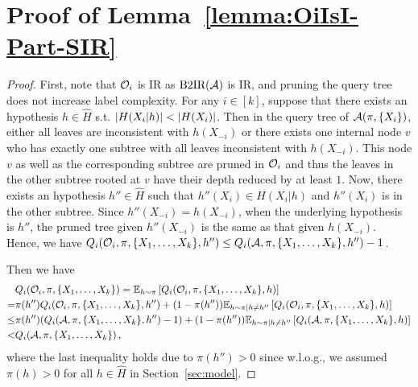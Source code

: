 \section{Proof of Lemma~\ref{lemma:OiIsI-Part-SIR}}\label{app_lmm3}
\begin{proof}
    First, note that $\mathcal{O}_i$ is IR as $\textrm{B2IR}(\mathcal{A})$ is IR, and pruning the query tree does not increase label complexity.
    For any $i\in [k]$, suppose that there exists an hypothesis $h\in \hat H$ s.t. $\left|H(X_i|h)\right| < \left|H(X_i)\right|$.
    Then in the query tree of $\mathcal{A}(\pi, \{X_i\})$, either all leaves are inconsistent with $h(X_{-i})$ or there exists one internal node $v$ who has exactly one subtree with all leaves inconsistent with $h(X_{-i})$.
    This node $v$ as well as the corresponding subtree are pruned in $\mathcal{O}_i$ and thus the leaves in the other subtree rooted at $v$  have their depth reduced by at least $1$. Now, there exists an hypothesis $h''\in \hat H$ such that $h''(X_i)\in H(X_i|h)$ and $h''(X_i)$ is in the other subtree.
    Since $h''(X_{-i}) = h(X_{-i})$, when the underlying hypothesis is $h''$, the pruned tree given $h''(X_{-i})$ is the same as that given $ h(X_{-i})$. Hence, we have $Q_i(\mathcal{O}_i,\pi,\{X_1,\ldots,X_k\}, h'') \leq Q_i(\mathcal{A},\pi,\{X_1,\ldots,X_k\},h'')-1$.
    
    Then we have 
    \begin{align*}
        &Q_i(\mathcal{O}_i,\pi,\{X_1,\ldots,X_k\}) =  \mathbb{E}_{h\sim \pi}\left[Q_i(\mathcal{O}_i,\pi,\{X_1,\ldots,X_k\}, h)\right]
        \\
        =& \pi(h'')Q_i(\mathcal{O}_i,\pi,\{X_1,\ldots,X_k\}, h'') + (1-\pi(h''))\mathbb{E}_{h\sim \pi|h \neq h''}\left[Q_i(\mathcal{O}_i,\pi,\{X_1,\ldots,X_k\}, h)\right]\\
        \leq & \pi(h'')(Q_i(\mathcal{A},\pi,\{X_1,\ldots,X_k\}, h'')-1) + (1-\pi(h''))\mathbb{E}_{h\sim \pi|h\neq h''}\left[Q_i(\mathcal{A},\pi,\{X_1,\ldots,X_k\}, h)\right]\\
        <& Q_i(\mathcal{A},\pi,\{X_1,\ldots,X_k\})\,,
    \end{align*}
where the last inequality holds due to $\pi(h'')>0$ since  w.l.o.g., we assumed $\pi(h)>0$ for all $h\in \hat H$ in Section~\ref{sec:model}.
\end{proof}